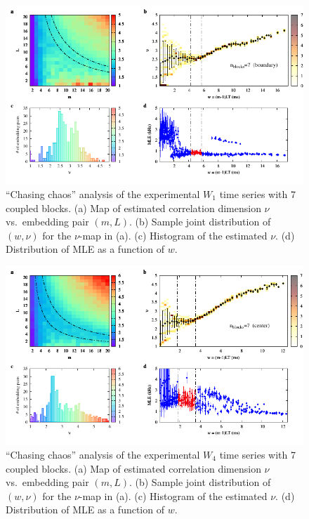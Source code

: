 \begin{appendices}
\begin{figure}[!htbp]
    \centering
    \includegraphics[width=\linewidth]{../blocks/7_blocks/edge/2e5_points/plots/chaos_low.pdf}
    \caption{``Chasing chaos'' analysis of the experimental $W_1$ time series with 7 coupled blocks.
    (a) Map of estimated correlation dimension $\nu$ vs.\ embedding pair $(m, L)$.
    (b) Sample joint distribution of $(w,\nu)$ for the $\nu$-map in (a).
    (c) Histogram of the estimated $\nu$. (d) Distribution of MLE as a function of $w$.
    } 
\end{figure}

\begin{figure}[!htbp]
    \centering
    \includegraphics[width=\linewidth]{../blocks/7_blocks/middle/2e5_points/plots/chaos_low.pdf}
    \caption{``Chasing chaos'' analysis of the experimental $W_4$ time series with 7 coupled blocks.
    (a) Map of estimated correlation dimension $\nu$ vs.\ embedding pair $(m, L)$.
    (b) Sample joint distribution of $(w,\nu)$ for the $\nu$-map in (a).
    (c) Histogram of the estimated $\nu$. (d) Distribution of MLE as a function of $w$.
    } 
\end{figure}


\end{appendices}
